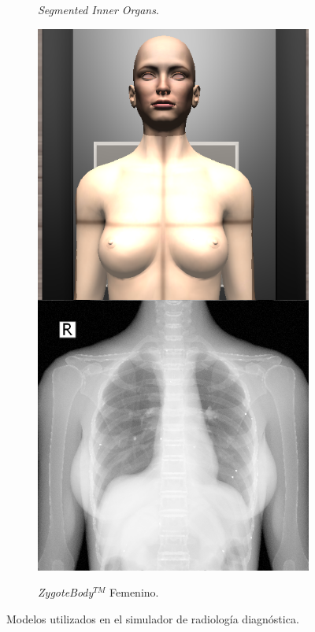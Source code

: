 \begin{figure}[h]
\begin{subfigure}[b]{0.24\linewidth}
        \caption{\emph{Segmented Inner Organs}\label{subfig:HVP}.}
    \end{subfigure}
     \begin{subfigure}[b]{0.24\linewidth}
        \centering
        {\includegraphics[width=\linewidth]{IMG/femaleex.png}}
        \caption{\emph{ZygoteBody}$^{TM}$ Femenino.}
    \end{subfigure}
    \caption{\label{fig:xraymodels} Modelos utilizados en el simulador de radiología diagnóstica.}
   \end{figure}
   
